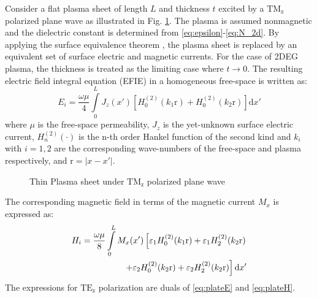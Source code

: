 \documentclass[conference, 10pt]{IEEEtran}
\renewcommand{\O}{\omega}  %
\newcommand{\E}{\varepsilon}  %
\renewcommand{\u}{\mu}  %
\renewcommand{\^}{\hat}  %
\begin{document}
Consider a flat plasma sheet of length $L$ and thickness $t$ excited by a $\mathrm{TM_z}$ polarized plane wave as illustrated in Fig. \ref{fig:plate}. The plasma is assumed nonmagnetic and the dielectric constant is determined from \eqref{eq:epsilon}-\eqref{eq:N_2d}. By applying the surface equivalence theorem \cite[p. 328-333]{balanis2012advanced}, the plasma sheet is replaced by an equivalent set of surface electric and magnetic currents. For the case of 2DEG plasma, the thickness is treated as the limiting case where $t \to 0$. The resulting electric field integral equation (EFIE) in a homogeneous free-space is written as:
%
\begin{equation}
  E_i = \frac{\O \u}{4} \int \limits_{0}^{L} J_z(x') \left[ H_0^{(2)}(k_1 \mathrm r) + H_0^{(2)}(k_2 \mathrm r)\right] \mathrm{d}x'
  \label{eq:plateE}
\end{equation}
%
where $\mu$ is the free-space permeability, $J_z$ is the yet-unknown surface electric current, $H_n^{(2)}(\cdot)$ is the n-th order Hankel function of the second kind and $k_i$ with $i = 1,2$ are the corresponding wave-numbers of the free-space and plasma respectively, and $\mathrm r = |x - x'|$.
%
\begin{figure}[h]
  \normalsize
  \centering
  
  \caption{Thin Plasma sheet under $\mathrm{TM_z}$ polarized plane wave}
  \label{fig:plate}
\end{figure}
%
The corresponding magnetic field in terms of the magnetic current $M_x$ is expressed as:
\begin{align}
  H_i = \frac{\O \u}{8}\int \limits_{0}^{L}  M_x(x')\left[ \E_1 H_0^{(2)}(k_1 \mathrm r) + \E_1 H_2^{(2)}(k_2 \mathrm r) \right.\notag\\
  \left. + \E_2 H_0^{(2)}(k_2 \mathrm r) + \E_2 H_2^{(2)}(k_2 \mathrm r) \right]\mathrm{d}x'
  \label{eq:plateH}
\end{align}
The expressions for $\mathrm{TE_z}$ polarization are duals of \eqref{eq:plateE} and \eqref{eq:plateH}.
\end{document}
